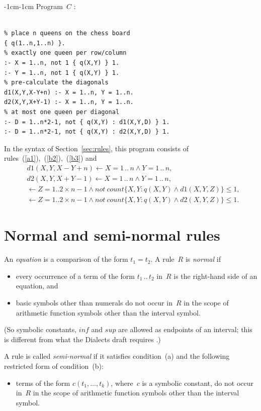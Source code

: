 \documentclass[11pt]{article}
\def\ar{\leftarrow}
\begin{document}
\begin{adjustwidth}{-1cm}{-1cm}
Program~$C$ \cite[Table~4]{geb11b}:
\begin{verbatim}

% place n queens on the chess board
{ q(1..n,1..n) }.
% exactly one queen per row/column
:- X = 1..n, not 1 { q(X,Y) } 1.
:- Y = 1..n, not 1 { q(X,Y) } 1.
% pre-calculate the diagonals
d1(X,Y,X-Y+n) :- X = 1..n, Y = 1..n.
d2(X,Y,X+Y-1) :- X = 1..n, Y = 1..n.
% at most one queen per diagonal
:- D = 1..n*2-1, not { q(X,Y) : d1(X,Y,D) } 1.
:- D = 1..n*2-1, not { q(X,Y) : d2(X,Y,D) } 1.

\end{verbatim}

In the syntax of Section~\ref{sec:rules}, this program consists of
rules~(\ref{a1}),~(\ref{b2}),~(\ref{b3}) and
\begin{align}
&d1(X,Y,X-Y+n) \ar X = 1\,..\,n\land Y = 1\,..\,n,\label{c4}\\
&d2(X,Y,X+Y-1) \ar X = 1\,..\,n\land Y = 1\,..\,n,\label{c5}\\
&\ar Z = 1..2\times n-1\land not\ count \{ X,Y: q(X,Y) \land d1(X,Y,Z) \} \leq 1,\label{c6}\\
&\ar Z = 1..2\times n-1\land not\ count   \{X,Y:  q(X,Y) \land d2(X,Y,Z) \} \leq 1.\label{c7}    
\end{align}

\section{Normal and semi-normal rules} \label{sec:normal}

An \emph{equation} is a comparison of the form $t_1=t_2$.
A rule~$R$ is \emph{normal} if
\begin{itemize}
\item[(a)]
  every occurrence of a term of the form $t_1\,..\,t_2$ in~$R$
is the right-hand side of an equation, and
\item[(b)]
basic symbols other than numerals do not occur in~$R$ in the scope
of arithmetic function symbols other than the interval symbol.
\end{itemize}
(So symbolic constants, $\mathit{inf}$ and $\mathit{sup}$ are allowed
as endpoints of an interval; this is different from what the Dialects draft
requires \cite[Section~3]{fan26b}.)

A rule is called {\em semi-normal} if it satisfies condition~(a) and the
following restricted form of condition~(b):
\begin{itemize}
\item[(b$'$)]
  terms of the form $c(t_1,\dots,t_k)$, where~$c$ is a symbolic constant,
  do not occur in~$R$ in the scope
  of arithmetic function symbols other than the interval symbol.
\end{itemize}


\end{adjustwidth}
\end{document}
